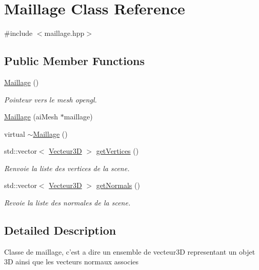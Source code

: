\hypertarget{class_maillage}{\section{Maillage Class Reference}
\label{class_maillage}
}


{\ttfamily \#include $<$maillage.\+hpp$>$}

\subsection*{Public Member Functions}
\begin{DoxyCompactItemize}
\item 
\hyperlink{class_maillage_a296104d8e2eacc14ed75a6410c00ba59}{Maillage} ()
\begin{DoxyCompactList}\small\item\em Pointeur vers le mesh opengl. \end{DoxyCompactList}\item 
\hyperlink{class_maillage_ad0d19d31a998c63802c6b6eeb4390894}{Maillage} (ai\+Mesh $\ast$maillage)
\item 
virtual \hyperlink{class_maillage_a6920b6d80a055589e19c684a924f1b0f}{$\sim$\+Maillage} ()
\item 
std\+::vector$<$ \hyperlink{class_vecteur3_d}{Vecteur3\+D} $>$ \hyperlink{class_maillage_ad77833666dce6bc9853c5b900d6a5da1}{get\+Vertices} ()
\begin{DoxyCompactList}\small\item\em Renvoie la liste des vertices de la scene. \end{DoxyCompactList}\item 
std\+::vector$<$ \hyperlink{class_vecteur3_d}{Vecteur3\+D} $>$ \hyperlink{class_maillage_a979dfc1cbfde99689d8784af28d71cc6}{get\+Normals} ()
\begin{DoxyCompactList}\small\item\em Revoie la liste des normales de la scene. \end{DoxyCompactList}\end{DoxyCompactItemize}


\subsection{Detailed Description}
Classe de maillage, c'est a dire un ensemble de vecteur3\+D representant un objet 3\+D ainsi que les vecteurs normaux associes 

